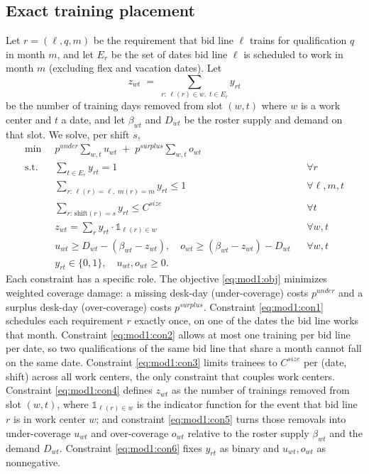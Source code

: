 \documentclass[preprint,12pt]{elsarticle}
\begin{document}
   \subsection{Exact training placement}
   Let $r=(\ell,q,m)$ be the requirement that bid line $\ell$ trains for qualification $q$ in month $m$, and let $E_r$ be the set of dates bid line $\ell$ is scheduled to work in month $m$ (excluding flex and vacation dates). Let
   $$z_{wt} \;=\; \sum\limits_{r:\,\ell(r)\in w,\;t\in E_r} y_{rt}$$
   be the number of training days removed from slot $(w,t)$ where $w$ is a work center and $t$ a date, and let $\beta_{wt}$ and $D_{wt}$ be the roster supply and demand on that slot. We solve, per shift $s$,
   \begin{align}
      \min \;\; & p^{under}\sum\limits_{w,t} u_{wt} \;+\; p^{surplus}\sum\limits_{w,t} o_{wt} \label{eq:mod1:obj}\\
      \text{s.t.}\;\; & \sum\limits_{t\in E_r} y_{rt} = 1 && \forall r \label{eq:mod1:con1}\\
      & \sum\limits_{r:\,\ell(r)=\ell,\;m(r)=m} y_{rt} \le 1 && \forall \ell,m,t \label{eq:mod1:con2}\\
      & \sum\limits_{r:\,\text{shift}(r)=s} y_{rt} \le C^{size} && \forall t \label{eq:mod1:con3}\\
      & z_{wt} = \sum\limits_{r} y_{rt} \cdot \mathds{1}_{\ell(r)\in w} && \forall w,t \label{eq:mod1:con4}\\
      & u_{wt} \ge D_{wt} - (\beta_{wt}-z_{wt}),\quad o_{wt} \ge (\beta_{wt}-z_{wt}) - D_{wt} && \forall w,t \label{eq:mod1:con5}\\
      & y_{rt}\in\{0,1\},\quad u_{wt},o_{wt}\ge 0 . \label{eq:mod1:con6}
   \end{align}
   Each constraint has a specific role. The objective \eqref{eq:mod1:obj} minimizes weighted coverage damage: a missing desk-day (under-coverage) costs $p^{under}$ and a surplus desk-day (over-coverage) costs $p^{surplus}$. Constraint \eqref{eq:mod1:con1} schedules each requirement $r$ exactly once, on one of the dates the bid line works that month. Constraint \eqref{eq:mod1:con2} allows at most one training per bid line per date, so two qualifications of the same bid line that share a month cannot fall on the same date. Constraint \eqref{eq:mod1:con3} limits trainees to $C^{size}$ per (date, shift) across all work centers, the only constraint that couples work centers. Constraint \eqref{eq:mod1:con4} defines $z_{wt}$ as the number of trainings removed from slot $(w,t)$, where $\mathds{1}_{\ell(r)\in w}$ is the indicator function for the event that bid line $r$ is in work center $w$; and constraint \eqref{eq:mod1:con5} turns those removals into under-coverage $u_{wt}$ and over-coverage $o_{wt}$ relative to the roster supply $\beta_{wt}$ and the demand $D_{wt}$. Constraint \eqref{eq:mod1:con6} fixes $y_{rt}$ as binary and $u_{wt},o_{wt}$ as nonnegative.
\end{document}
